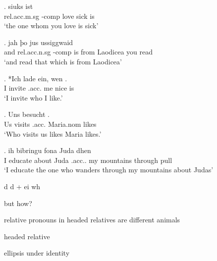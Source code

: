 \documentclass[11pt,hidelinks]{memoir}
\begin{document}

\exg.    siuks ist\\
\ac{rel}.\ac{acc}.\ac{m}.\ac{sg} -\ac{comp} love\scsub{[acc]} sick is\scsub{[nom]}\\
`the one whom you love is sick' \label{ex:gothic-acc-nom}

\exg. jah þo     jus ussiggwaid\\
and \ac{rel}.\ac{acc}.\ac{n}.\ac{sg} -\ac{comp} is\scsub{[nom]} from Laodicea you read\scsub{[acc]}\\
`and read that which is from Laodicea' \label{ex:gothic-nom-acc}

\exg. *Ich {lade ein}, wen   .\\
 I invite\scsub{[acc]} .\ac{acc}. me nice is\scsub{[nom]}\\
 `I invite who I like.' 

\exg. Uns besucht   .\\
 Us visits\scsub{[nom]} .\ac{acc}. Maria.\ac{nom} likes\scsub{[acc]}\\
 `Who visits us likes Maria likes.' \label{ex:mg-nom-acc}

\exg. ih bibringu fona Juda dhen   \\
 I educate\scsub{[acc]} about Juda .\ac{acc}.. my mountains {through pull}\scsub{[nom]}\\
 `I educate the one who wanders through my mountains about Judas' \label{ex:ohg-acc-nom}


d
d + ei
wh

but how?

relative pronouns in headed relatives are different animals


headed relative

ellipsis under identity


\end{document}
